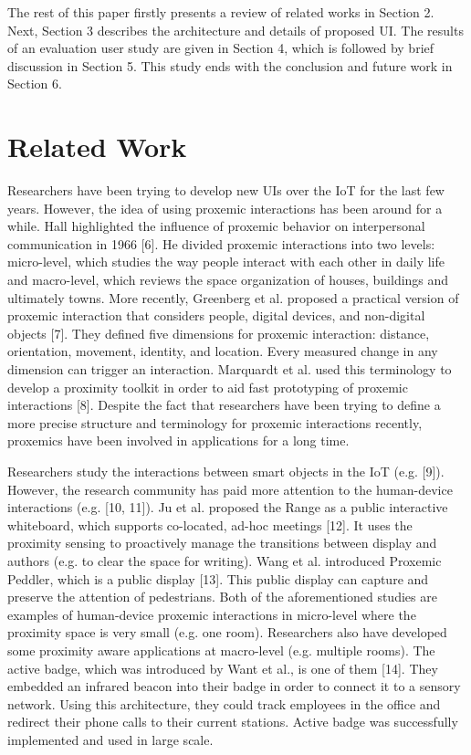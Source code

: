 \documentclass[]{IEEEphot}
\begin{document}
The rest of this paper firstly presents a review of related works in Section
2. Next, Section 3 describes the architecture and details of proposed UI. The
results of an evaluation user study are given in Section 4, which is followed by
brief discussion in Section 5. This study ends with the conclusion and future
work in Section 6.


\section{ Related Work}

Researchers have been trying to develop new UIs over the IoT for the last few
years. However, the idea of using proxemic interactions has been around for
a while. Hall highlighted the influence of proxemic behavior on interpersonal
communication in 1966 [6]. He divided proxemic interactions into two levels:
micro-level, which studies the way people interact with each other in daily life
and macro-level, which reviews the space organization of houses, buildings and
ultimately towns. More recently, Greenberg et al. proposed a practical version
of proxemic interaction that considers people, digital devices, and non-digital
objects [7]. They defined five dimensions for proxemic interaction: distance, orientation, movement, identity, and location. Every measured change in any dimension can trigger an interaction. Marquardt et al. used this terminology to
develop a proximity toolkit in order to aid fast prototyping of proxemic interactions [8]. Despite the fact that researchers have been trying to define a more
precise structure and terminology for proxemic interactions recently, proxemics
have been involved in applications for a long time.



Researchers study the interactions between smart objects in the IoT (e.g. [9]).
However, the research community has paid more attention to the human-device interactions (e.g. [10, 11]). Ju et al. proposed the Range as a public interactive
whiteboard, which supports co-located, ad-hoc meetings [12]. It uses the proximity sensing to proactively manage the transitions between display and authors
(e.g. to clear the space for writing). Wang et al. introduced Proxemic Peddler,
which is a public display [13]. This public display can capture and preserve the
attention of pedestrians. Both of the aforementioned studies are examples of
human-device proxemic interactions in micro-level where the proximity space
is very small (e.g. one room). Researchers also have developed some proximity
aware applications at macro-level (e.g. multiple rooms). The active badge, which
was introduced by Want et al., is one of them [14]. They embedded an infrared
beacon into their badge in order to connect it to a sensory network. Using this
architecture, they could track employees in the office and redirect their phone
calls to their current stations. Active badge was successfully implemented and
used in large scale.
\end{document}
